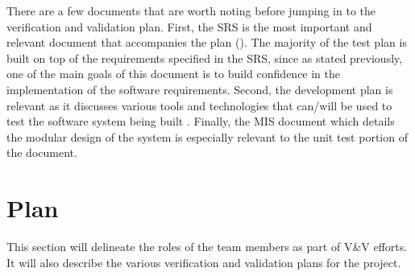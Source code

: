 \documentclass[12pt, titlepage]{article}
\begin{document}
There are a few documents that are worth noting before jumping in to the verification and validation plan.
First, the SRS is the most important and relevant document that accompanies the plan  (\citet{SRS}). The majority of the test plan 
is built on top of the requirements specified in the SRS, since as stated previously, one of the main goals of this document is to 
build confidence in the implementation of the software requirements. Second, the development plan is relevant as it discusses various tools 
and technologies that can/will be used to test the software system being built {\citet{DevPlan}}. Finally, the MIS document which details the modular design 
of the system is especially relevant to the unit test portion of the document.

\section{Plan}
This section will delineate the roles of the team members as part of V\&V efforts. 
It will also describe the various verification and validation plans for the project.
\end{document}
